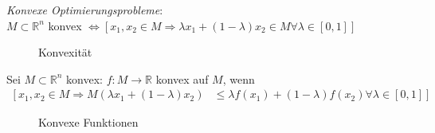 \textit{Konvexe Optimierungsprobleme}:\\
$M\subset\mathbb{R}^n$ konvex $\Leftrightarrow \left[x_1,x_2\in M\Rightarrow \lambda x_1+(1-\lambda)x_2\in M\forall\lambda\in[0,1]\right]$
\begin{figure}[!htb]
	\centering
	\subfloat[konvex]{}\qquad
	\caption{Konvexität}
	\label{fig:kap_1_konvex}
\end{figure}

Sei $M\subset\mathbb{R}^n$ konvex: $f:M\rightarrow\mathbb{R}$ konvex auf $M$, wenn 
\begin{align*}
	\left[ x_1,x_2\in M \Rightarrow M(\lambda x_1+(1-\lambda)x_2)\right. & \left.\le \lambda f(x_1)+(1-\lambda)f(x_2)\forall\lambda\in[0,1]\right]
\end{align*}
\begin{figure}[!htb]
	\centering
	\subfloat[$f$ konvex]{}\qquad
	\caption{Konvexe Funktionen}
	\label{fig:kap_1_konvex_fkt}
\end{figure}

